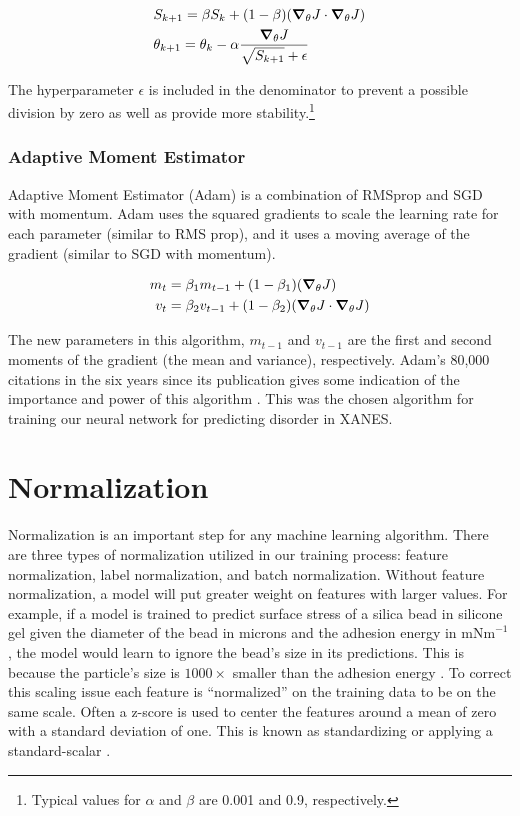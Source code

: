\begin{align}
    \label{eqn:RMS_Prop}
    & S_{k+1} = \beta S_k + (1 - \beta)(\grad_\theta J \cdot \grad_\theta J) \\
    & \theta_{k+1} = \theta_k - \alpha \frac{\grad_\theta J}{\sqrt{S_{k+1}} + \epsilon}
\end{align}

\noindent The hyperparameter $ \epsilon $ is included in the denominator to prevent a possible division by zero as well as provide more stability.\footnote{Typical values for $ \alpha $  and $ \beta $  are 0.001 and 0.9, respectively.} 

\subsubsection{Adaptive Moment Estimator}
Adaptive Moment Estimator (Adam) is a combination of RMSprop and SGD with momentum. Adam uses the squared gradients to scale the learning rate for each parameter (similar to RMS prop), and it uses a moving average of the gradient (similar to SGD with momentum).

\begin{align} 
    \begin{split} 
    m_t &= \beta_1 m_{t-1} + (1 - \beta_1) (\grad_\theta J) \\ 
    v_t &= \beta_2 v_{t-1} + (1 - \beta_2) (\grad_\theta J \cdot \grad_\theta J) 
    \end{split} 
\end{align}

\noindent The new parameters in this algorithm, $ m_{t-1} $ and $ v_{t-1} $ are the first and second moments of the gradient (the mean and variance), respectively. Adam's 80,000 citations in the six years since its publication gives some indication of the importance and power of this algorithm \cite{orig-ADAM-paper}. This was the chosen algorithm for training our neural network for predicting disorder in XANES.

\section{Normalization} \label{sec:normalization}
Normalization is an important step for any machine learning algorithm. There are three types of normalization utilized in our training process: feature normalization, label normalization, and batch normalization. Without feature normalization, a model will put greater weight on features with larger values. For example, if a model is trained to predict surface stress of a silica bead in silicone gel given the diameter of the bead in microns and the adhesion energy in $ \text{mNm}^{-1} $, the model would learn to ignore the bead's size in its predictions. This is because the particle's size is $ 1000\times $ smaller than the adhesion energy \cite{williamsThesis}. To correct this scaling issue each feature is ``normalized'' on the training data to be on the same scale. Often a z-score is used to center the features around a mean of zero with a standard deviation of one. This is known as standardizing or applying a standard-scalar \cite{statsTextbook}.


